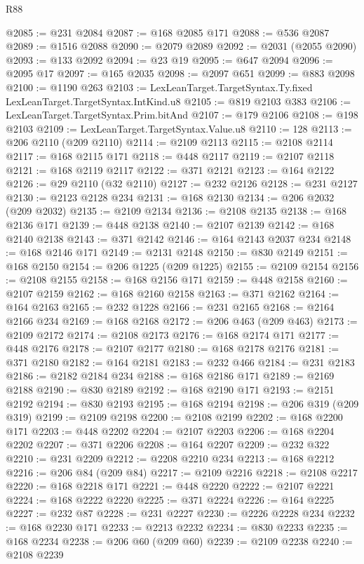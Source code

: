 \begin{lexlean}{R88}
\begin{coremodule}
@2085 := @231 @2084
@2087 := @168 @2085 @171
@2088 := @536 @2087
@2089 := @1516 @2088
@2090 := @2079 @2089
@2092 := @2031 (@2055 @2090)
@2093 := @133 @2092
@2094 := @23 @19
@2095 := @647 @2094
@2096 := @2095 @17
@2097 := @165 @2035
@2098 := @2097 @651
@2099 := @883 @2098
@2100 := @1190 @263
@2103 := LexLeanTarget.TargetSyntax.Ty.fixed LexLeanTarget.TargetSyntax.IntKind.u8
@2105 := @819 @2103 @383
@2106 := LexLeanTarget.TargetSyntax.Prim.bitAnd
@2107 := @179 @2106
@2108 := @198 @2103
@2109 := LexLeanTarget.TargetSyntax.Value.u8
@2110 := 128
@2113 := @206 @2110 (@209 @2110)
@2114 := @2109 @2113
@2115 := @2108 @2114
@2117 := @168 @2115 @171
@2118 := @448 @2117
@2119 := @2107 @2118
@2121 := @168 @2119 @2117
@2122 := @371 @2121
@2123 := @164 @2122
@2126 := @29 @2110 (@32 @2110)
@2127 := @232 @2126
@2128 := @231 @2127
@2130 := @2123 @2128 @234
@2131 := @168 @2130
@2134 := @206 @2032 (@209 @2032)
@2135 := @2109 @2134
@2136 := @2108 @2135
@2138 := @168 @2136 @171
@2139 := @448 @2138
@2140 := @2107 @2139
@2142 := @168 @2140 @2138
@2143 := @371 @2142
@2146 := @164 @2143 @2037 @234
@2148 := @168 @2146 @171
@2149 := @2131 @2148
@2150 := @830 @2149
@2151 := @168 @2150
@2154 := @206 @1225 (@209 @1225)
@2155 := @2109 @2154
@2156 := @2108 @2155
@2158 := @168 @2156 @171
@2159 := @448 @2158
@2160 := @2107 @2159
@2162 := @168 @2160 @2158
@2163 := @371 @2162
@2164 := @164 @2163
@2165 := @232 @1228
@2166 := @231 @2165
@2168 := @2164 @2166 @234
@2169 := @168 @2168
@2172 := @206 @463 (@209 @463)
@2173 := @2109 @2172
@2174 := @2108 @2173
@2176 := @168 @2174 @171
@2177 := @448 @2176
@2178 := @2107 @2177
@2180 := @168 @2178 @2176
@2181 := @371 @2180
@2182 := @164 @2181
@2183 := @232 @466
@2184 := @231 @2183
@2186 := @2182 @2184 @234
@2188 := @168 @2186 @171
@2189 := @2169 @2188
@2190 := @830 @2189
@2192 := @168 @2190 @171
@2193 := @2151 @2192
@2194 := @830 @2193
@2195 := @168 @2194
@2198 := @206 @319 (@209 @319)
@2199 := @2109 @2198
@2200 := @2108 @2199
@2202 := @168 @2200 @171
@2203 := @448 @2202
@2204 := @2107 @2203
@2206 := @168 @2204 @2202
@2207 := @371 @2206
@2208 := @164 @2207
@2209 := @232 @322
@2210 := @231 @2209
@2212 := @2208 @2210 @234
@2213 := @168 @2212
@2216 := @206 @84 (@209 @84)
@2217 := @2109 @2216
@2218 := @2108 @2217
@2220 := @168 @2218 @171
@2221 := @448 @2220
@2222 := @2107 @2221
@2224 := @168 @2222 @2220
@2225 := @371 @2224
@2226 := @164 @2225
@2227 := @232 @87
@2228 := @231 @2227
@2230 := @2226 @2228 @234
@2232 := @168 @2230 @171
@2233 := @2213 @2232
@2234 := @830 @2233
@2235 := @168 @2234
@2238 := @206 @60 (@209 @60)
@2239 := @2109 @2238
@2240 := @2108 @2239

\end{coremodule}
\end{lexlean}
